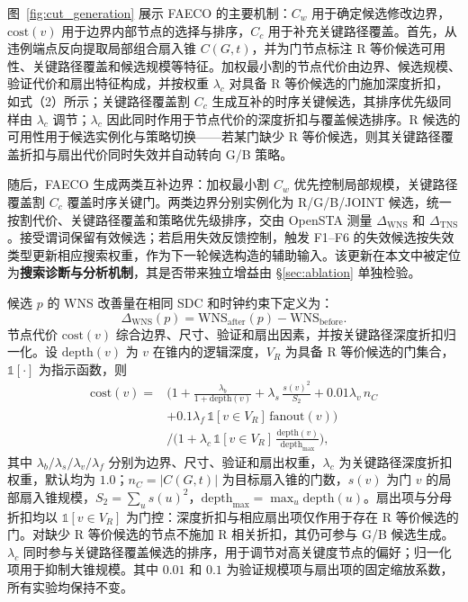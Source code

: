 \documentclass[twocolumn,10pt,fontset=windows]{ctexart}
\begin{document}
图~\ref{fig:cut_generation} 展示 FAECO 的主要机制：$C_w$ 用于确定候选修改边界，$\mathrm{cost}(v)$ 用于边界内部节点的选择与排序，$C_c$ 用于补充关键路径覆盖。首先，从违例端点反向提取局部组合扇入锥 $C(G,t)$，并为门节点标注 R 等价候选可用性、关键路径覆盖和候选规模等特征。加权最小割的节点代价由边界、候选规模、验证代价和扇出特征构成，并按权重 $\lambda_c$ 对具备 R 等价候选的门施加深度折扣，如式（2）所示；关键路径覆盖割 $C_c$ 生成互补的时序关键候选，其排序优先级同样由 $\lambda_c$ 调节；$\lambda_c$ 因此同时作用于节点代价的深度折扣与覆盖候选排序。R 候选的可用性用于候选实例化与策略切换——若某门缺少 R 等价候选，则其关键路径覆盖折扣与扇出代价同时失效并自动转向 G/B 策略。

随后，FAECO 生成两类互补边界：加权最小割 $C_w$ 优先控制局部规模，关键路径覆盖割 $C_c$ 覆盖时序关键门。两类边界分别实例化为 R/G/B/JOINT 候选，统一按割代价、关键路径覆盖和策略优先级排序，交由 OpenSTA 测量 $\Delta_{\mathrm{WNS}}$ 和 $\Delta_{\mathrm{TNS}}$。接受谓词保留有效候选；若启用失效反馈控制，触发 F1--F6 的失效候选按失效类型更新相应搜索权重，作为下一轮候选构造的辅助输入。该更新在本文中被定位为\textbf{搜索诊断与分析机制}，其是否带来独立增益由 \S\ref{sec:ablation} 单独检验。

候选 $p$ 的 WNS 改善量在相同 SDC 和时钟约束下定义为：
\begin{equation}\label{eq:dtiming}
\Delta_{\mathrm{WNS}}(p) = \mathrm{WNS}_{\mathrm{after}}(p) - \mathrm{WNS}_{\mathrm{before}}.
\end{equation}
节点代价 $\mathrm{cost}(v)$ 综合边界、尺寸、验证和扇出因素，并按关键路径深度折扣归一化。设 $\mathrm{depth}(v)$ 为 $v$ 在锥内的逻辑深度，$V_R$ 为具备 R 等价候选的门集合，$\mathbb{1}[\cdot]$ 为指示函数，则
{\small
\begin{equation}
\label{eq:cost}
\begin{aligned}
\mathrm{cost}(v) ={}& \Big(1 + \frac{\lambda_b}{1+\mathrm{depth}(v)}
 + \lambda_s\,\frac{s(v)^2}{S_2}
 + 0.01\lambda_v\,n_C \\
 &+ 0.1\lambda_f\,\mathbb{1}[v{\in}V_R]\,\mathrm{fanout}(v)\Big) \\
 &\Big/\Big(1 + \lambda_c\,\mathbb{1}[v{\in}V_R]\,
 \frac{\mathrm{depth}(v)}{\mathrm{depth}_{\max}}\Big),
\end{aligned}
\end{equation}
}
其中 $\lambda_b/\lambda_s/\lambda_v/\lambda_f$ 分别为边界、尺寸、验证和扇出权重，$\lambda_c$ 为关键路径深度折扣权重，默认均为 $1.0$；$n_C=|C(G,t)|$ 为目标扇入锥的门数，$s(v)$ 为门 $v$ 的局部扇入锥规模，$S_2=\sum_u s(u)^2$，$\mathrm{depth}_{\max}=\max_u \mathrm{depth}(u)$。扇出项与分母折扣均以 $\mathbb{1}[v{\in}V_R]$ 为门控：深度折扣与相应扇出项仅作用于存在 R 等价候选的门。对缺少 R 等价候选的节点不施加 R 相关折扣，其仍可参与 G/B 候选生成。$\lambda_c$ 同时参与关键路径覆盖候选的排序，用于调节对高关键度节点的偏好；归一化项用于抑制大锥规模。其中 $0.01$ 和 $0.1$ 为验证规模项与扇出项的固定缩放系数，所有实验均保持不变。
\end{document}
